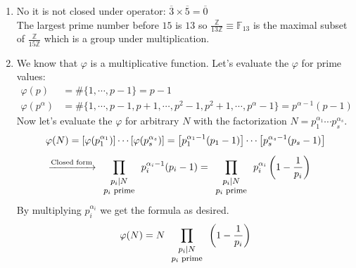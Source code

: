 \documentclass{article}
\begin{document}
\begin{itemize}
\begin{enumerate}[label=(\alph*)]
			\item No it is not closed under operator: $\overline{3} \times \overline{5} = \overline{0}$\\
				  The largest prime number before $15$ is $13$ so $\frac{\mathbb{Z}}{13\mathbb{Z}}\equiv \mathbb{F}_{13}$ 
				  is the maximal subset of 
				$\frac{\mathbb{Z}}{15\mathbb{Z}}$ which is a group under multiplication.

			\item We know that $\varphi$ is a multiplicative function. Let's evaluate the $\varphi$ for prime values:
				\begin{align*}
						\varphi(p) &= \#\{1,\cdots,p-1\} = p-1\\
						\varphi(p^{\alpha}) &= \# \{1,\cdots,p-1,p+1,\cdots,p^2-1,p^2+1,\cdots,p^{\alpha}-1\}=
						p^{\alpha-1}(p-1)
				\end{align*}
				Now let's evaluate the $\varphi$ for arbitrary $N$ with the factorization $N=p_1^{\alpha_{1}}\cdots p_s^{\alpha_{s}}$.
				\begin{align*}
					&\varphi(N) = \left[\varphi(p_1^{\alpha_{1}})\right]\cdots \left[\varphi(p_s^{\alpha_{s}})\right]=
					\left[p_1^{\alpha_{1}-1}(p_1-1)\right]\cdots \left[p_s^{\alpha_{s}-1}(p_s-1)\right]\\[5pt]
					&\xrightarrow{\text{Closed form}} \prod_{\footnotesize\begin{array}{c}p_i|N \\ p_i \text{ prime}\end{array}}
					{p_i^{\alpha_{i}-1}(p_i-1)} =  \prod_{\footnotesize\begin{array}{c}p_i|N \\ p_i \text{ prime}\end{array}}
					{p_i^{\alpha_{i}}\left(1 - \frac{1}{p_i}\right)}
				\end{align*}
				By multiplying $p_i^{\alpha_i}$ we get the formula as desired.
				\begin{align*}
					\varphi(N) = N \prod_{\footnotesize\begin{array}{c}p_i|N \\ p_i \text{ prime}\end{array}}
					{\left(1-\frac{1}{p_i}\right)}
				\end{align*}
		\end{enumerate}


\end{itemize}
\end{document}
